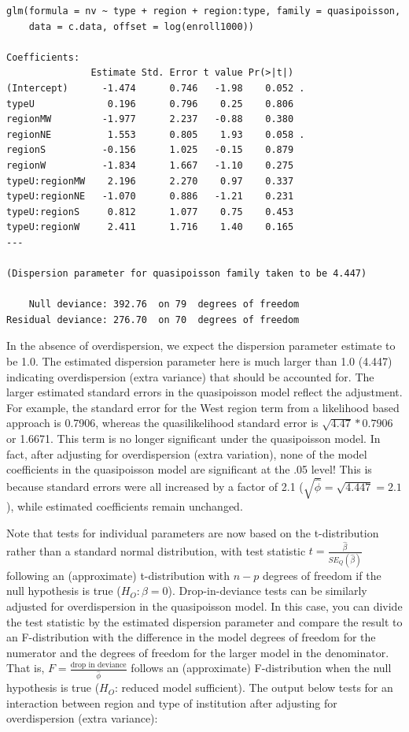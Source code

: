 \documentclass[
]{krantz}
\begin{document}
\begin{verbatim}
glm(formula = nv ~ type + region + region:type, family = quasipoisson, 
    data = c.data, offset = log(enroll1000))

Coefficients:
               Estimate Std. Error t value Pr(>|t|)  
(Intercept)      -1.474      0.746   -1.98    0.052 .
typeU             0.196      0.796    0.25    0.806  
regionMW         -1.977      2.237   -0.88    0.380  
regionNE          1.553      0.805    1.93    0.058 .
regionS          -0.156      1.025   -0.15    0.879  
regionW          -1.834      1.667   -1.10    0.275  
typeU:regionMW    2.196      2.270    0.97    0.337  
typeU:regionNE   -1.070      0.886   -1.21    0.231  
typeU:regionS     0.812      1.077    0.75    0.453  
typeU:regionW     2.411      1.716    1.40    0.165  
---

(Dispersion parameter for quasipoisson family taken to be 4.447)

    Null deviance: 392.76  on 79  degrees of freedom
Residual deviance: 276.70  on 70  degrees of freedom
\end{verbatim}

In the absence of overdispersion, we expect the dispersion parameter estimate to be 1.0. The estimated dispersion parameter here is much larger than 1.0 (4.447) indicating overdispersion (extra variance) that should be accounted for. The larger estimated standard errors in the quasipoisson model reflect the adjustment. For example, the standard error for the West region term from a likelihood based approach is 0.7906, whereas the quasilikelihood standard error is \(\sqrt{4.47}*0.7906\) or 1.6671. This term is no longer significant under the quasipoisson model. In fact, after adjusting for overdispersion (extra variation), none of the model coefficients in the quasipoisson model are significant at the .05 level! This is because standard errors were all increased by a factor of 2.1 (\(\sqrt{\hat\phi}=\sqrt{4.447}=2.1\)), while estimated coefficients remain unchanged.

Note that tests for individual parameters are now based on the t-distribution rather than a standard normal distribution, with test statistic \(t=\frac{\hat\beta}{SE_Q(\hat\beta)}\) following an (approximate) t-distribution with \(n-p\) degrees of freedom if the null hypothesis is true (\(H_O:\beta=0\)). Drop-in-deviance tests can be similarly adjusted for overdispersion in the quasipoisson model. In this case, you can divide the test statistic by the estimated dispersion parameter and compare the result to an F-distribution with the difference in the model degrees of freedom for the numerator and the degrees of freedom for the larger model in the denominator. That is, \(F=\frac{\textrm{drop in deviance}}{\hat\phi}\) follows an (approximate) F-distribution when the null hypothesis is true (\(H_O\): reduced model sufficient). The output below tests for an interaction between region and type of institution after adjusting for overdispersion (extra variance):
\end{document}
